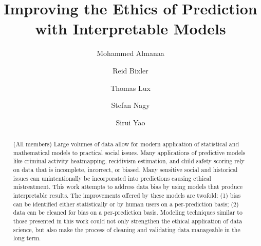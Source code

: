 \documentclass[sigconf]{acmart}
\begin{document}
\title{Improving the Ethics of Prediction with Interpretable Models}

\author{Mohammed Almanaa}

\author{Reid Bixler}

\author{Thomas Lux}
 
\author{Stefan Nagy}

\author{Sirui Yao}




\begin{abstract}
(All members) Large volumes of data allow for modern application of statistical and mathematical models to practical social issues. Many applications of predictive models like criminal activity heatmapping, recidivism estimation, and child safety scoring rely on data that is incomplete, incorrect, or biased. Many sensitive social and historical issues can unintentionally be incorporated into predictions causing ethical mistreatment. This work attempts to address data bias by using models that produce interpretable results. The improvements offered by these models are twofold: (1) bias can be identified either statistically or by human users on a per-prediction basis; (2) data can be cleaned for bias on a per-prediction basis. Modeling techniques similar to those presented in this work could not only strengthen the ethical application of data science, but also make the process of cleaning and validating data manageable in the long term.
\end{abstract}
 
 \maketitle
 
\end{document}
